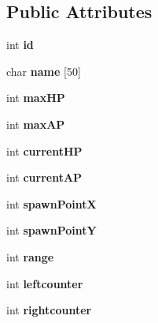 \subsection*{Public Attributes}
\begin{DoxyCompactItemize}
\item 
int {\bfseries id}\hypertarget{structEnemy_a70490642cc6e18ad3d0284dfa1930af3}{}\label{structEnemy_a70490642cc6e18ad3d0284dfa1930af3}

\item 
char {\bfseries name} \mbox{[}50\mbox{]}\hypertarget{structEnemy_a6c62136940d4dd9dd0c2a4cd7f8b1281}{}\label{structEnemy_a6c62136940d4dd9dd0c2a4cd7f8b1281}

\item 
int {\bfseries max\+HP}\hypertarget{structEnemy_a990ecf4cbfdae850b51e6fb2b367ad8e}{}\label{structEnemy_a990ecf4cbfdae850b51e6fb2b367ad8e}

\item 
int {\bfseries max\+AP}\hypertarget{structEnemy_aeae465e0f4dc57942fefa05801b8d35e}{}\label{structEnemy_aeae465e0f4dc57942fefa05801b8d35e}

\item 
int {\bfseries current\+HP}\hypertarget{structEnemy_a2891f607bd7c05774ab7efaf155c1842}{}\label{structEnemy_a2891f607bd7c05774ab7efaf155c1842}

\item 
int {\bfseries current\+AP}\hypertarget{structEnemy_a5abcfd0d6c94e944f4d360eaa55697ef}{}\label{structEnemy_a5abcfd0d6c94e944f4d360eaa55697ef}

\item 
int {\bfseries spawn\+PointX}\hypertarget{structEnemy_a74809a13404cfdb35d7d565f3f11721a}{}\label{structEnemy_a74809a13404cfdb35d7d565f3f11721a}

\item 
int {\bfseries spawn\+PointY}\hypertarget{structEnemy_a99846a4490691509b7dff6ec1883d619}{}\label{structEnemy_a99846a4490691509b7dff6ec1883d619}

\item 
int {\bfseries range}\hypertarget{structEnemy_a78afb6ee76a1d0e570e17b75f81736ed}{}\label{structEnemy_a78afb6ee76a1d0e570e17b75f81736ed}

\item 
int {\bfseries leftcounter}\hypertarget{structEnemy_af0807029db68e4f2573487e20786c3d4}{}\label{structEnemy_af0807029db68e4f2573487e20786c3d4}

\item 
int {\bfseries rightcounter}\hypertarget{structEnemy_a430ccb5b75909614f2f485f43ed44cc9}{}\label{structEnemy_a430ccb5b75909614f2f485f43ed44cc9}


\end{DoxyCompactItemize}
